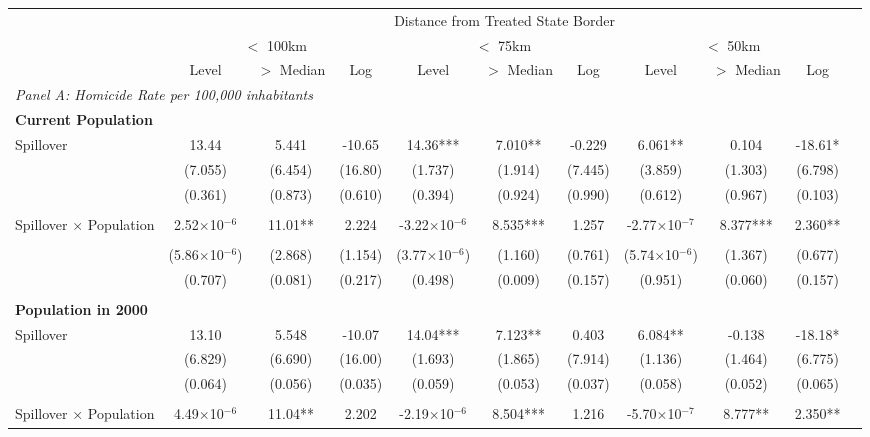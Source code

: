 \documentclass{article}
\begin{document}
\begin{table}[htbp]
\begin{adjustbox}{width=\textwidth}
\begin{tabular}{lcccccccccc}
\toprule
& \multicolumn{9}{c}{Distance from Treated State Border} \\
\cmidrule(lr){2-10}
& \multicolumn{3}{c}{$<$ 100km} & \multicolumn{3}{c}{$<$ 75km} & \multicolumn{3}{c}{$<$ 50km} \\
\cmidrule(lr){2-4} \cmidrule(lr){5-7} \cmidrule(lr){8-10}
& Level & $>$ Median & Log & Level & $>$ Median & Log & Level & $>$ Median & Log \\
\midrule
\multicolumn{10}{l}{\textit{Panel A: Homicide Rate per 100,000 inhabitants}} \\[0.5em]
\multicolumn{10}{l}{\textbf{Current Population}} \\[0.5em]
Spillover & 13.44 & 5.441 & -10.65 & 14.36*** & 7.010** & -0.229 & 6.061** & 0.104 & -18.61* \\
& (7.055) & (6.454) & (16.80) & (1.737) & (1.914) & (7.445) & (3.859) & (1.303) & (6.798) \\
& (0.361) & (0.873) & (0.610) & (0.394) & (0.924) & (0.990) & (0.612) & (0.967) & (0.103) \\\\
Spillover × Population & 2.52$\times$10$^{-6}$ & 11.01** & 2.224 & -3.22$\times$10$^{-6}$ & 8.535*** & 1.257 & -2.77$\times$10$^{-7}$ & 8.377*** & 2.360** \\\\
& (5.86$\times$10$^{-6}$) & (2.868) & (1.154) & (3.77$\times$10$^{-6}$) & (1.160) & (0.761) & (5.74$\times$10$^{-6}$) & (1.367) & (0.677) \\
& (0.707) & (0.081) & (0.217) & (0.498) & (0.009) & (0.157) & (0.951) & (0.060) & (0.157) \\\\
\multicolumn{10}{l}{\textbf{Population in 2000}} \\[0.5em]
Spillover & 13.10 & 5.548 & -10.07 & 14.04*** & 7.123** & 0.403 & 6.084** & -0.138 & -18.18* \\
& (6.829) & (6.690) & (16.00) & (1.693) & (1.865) & (7.914) & (1.136) & (1.464) & (6.775) \\
& (0.064) & (0.056) & (0.035) & (0.059) & (0.053) & (0.037) & (0.058) & (0.052) & (0.065) \\\\
Spillover × Population & 4.49$\times$10$^{-6}$ & 11.04** & 2.202 & -2.19$\times$10$^{-6}$ & 8.504*** & 1.216 & -5.70$\times$10$^{-7}$ & 8.777** & 2.350** \\

\end{tabular}
\end{adjustbox}
\end{table}
\end{document}
